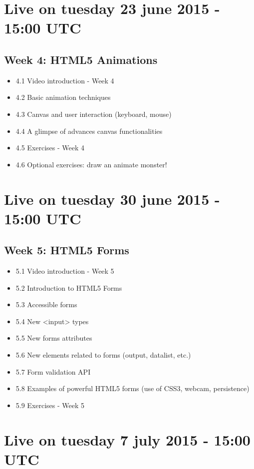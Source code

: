 \documentclass[a4paper,11pt]{book}
\begin{document}
\section{Live on tuesday 23 june 2015 - 15:00 UTC}
    \subsection{Week 4: HTML5 Animations}
    \begin{itemize}
        \item 4.1 Video introduction - Week 4
        \item 4.2 Basic animation techniques
        \item 4.3 Canvas and user interaction (keyboard, mouse)
        \item 4.4 A glimpse of advances canvas functionalities
        \item 4.5 Exercises - Week 4
        \item 4.6 Optional exercises: draw an animate monster!
    \end{itemize}

\section{Live on tuesday 30 june 2015 - 15:00 UTC}
    \subsection{Week 5: HTML5 Forms}
    \begin{itemize}
        \item 5.1 Video introduction - Week 5
        \item 5.2 Introduction to HTML5 Forms
        \item 5.3 Accessible forms
        \item 5.4 New <input> types
        \item 5.5 New forms attributes
        \item 5.6 New elements related to forms (output, datalist, etc.)
        \item 5.7 Form validation API
        \item 5.8 Examples of powerful HTML5 forms (use of CSS3, webcam, persistence)
        \item 5.9 Exercises - Week 5
    \end{itemize}

\section{Live on tuesday 7 july 2015 - 15:00 UTC}
\end{document}
